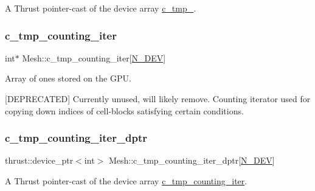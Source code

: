 A Thrust pointer-\/cast of the device array \hyperlink{classMesh_af5270c410a5690f1763f5d593d0c9e35}{c\+\_\+tmp\+\_}. 

\mbox{\label{classMesh_a0db99bf87d3b79d642e99a7ffe23c6b5}} 
\subsubsection{\texorpdfstring{c\+\_\+tmp\+\_\+counting\+\_\+iter}{c\_tmp\_counting\_iter}}
{\footnotesize\ttfamily int$\ast$ Mesh\+::c\+\_\+tmp\+\_\+counting\+\_\+iter\mbox{[}\hyperlink{cppspec_8h_a2b674dab7a14f1bf32b48b7fda5022dc}{N\+\_\+\+D\+EV}\mbox{]}\hspace{0.3cm}{\ttfamily [private]}}



Array of ones stored on the G\+PU. 

\mbox{[}D\+E\+P\+R\+E\+C\+A\+T\+ED\mbox{]} Currently unused, will likely remove. Counting iterator used for copying down indices of cell-\/blocks satisfying certain conditions. \mbox{\label{classMesh_a5d58a50232053a9d1991c812513deb14}} 
\subsubsection{\texorpdfstring{c\+\_\+tmp\+\_\+counting\+\_\+iter\+\_\+dptr}{c\_tmp\_counting\_iter\_dptr}}
{\footnotesize\ttfamily thrust\+::device\+\_\+ptr$<$int$>$ Mesh\+::c\+\_\+tmp\+\_\+counting\+\_\+iter\+\_\+dptr\mbox{[}\hyperlink{cppspec_8h_a2b674dab7a14f1bf32b48b7fda5022dc}{N\+\_\+\+D\+EV}\mbox{]}\hspace{0.3cm}{\ttfamily [private]}}



A Thrust pointer-\/cast of the device array \hyperlink{classMesh_a0db99bf87d3b79d642e99a7ffe23c6b5}{c\+\_\+tmp\+\_\+counting\+\_\+iter}. 

\mbox{\label{classMesh_a8112720b857381575b8c9c79983df670}} 
